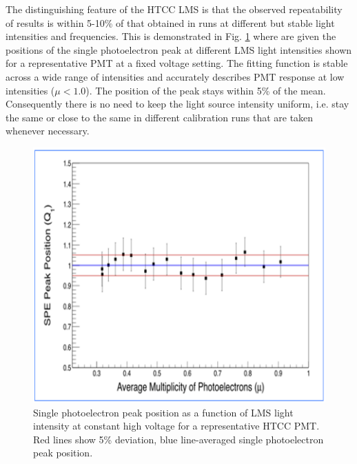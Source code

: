 The distinguishing feature of the HTCC LMS is that the observed repeatability of results is within 5-10\% of that obtained in runs at different but stable light intensities and frequencies. This is demonstrated in Fig. \ref{fig:WILLIAM_5} where are given the positions of the single photoelectron peak at different LMS light intensities shown for a representative PMT at a fixed voltage setting. The fitting function is stable across a wide range of intensities and accurately describes PMT response at low intensities ($\mu<1.0$). The position of the peak stays within 5\% of the mean. Consequently there is no need to keep the light source intensity uniform, i.e. stay the same or close to the same in different calibration runs that are taken whenever necessary.

\begin{figure}[ht]
\centering
\includegraphics[width=0.99\linewidth]{images/WILLIAM_5.png}
\caption{Single photoelectron peak position as a function of LMS light intensity at constant high voltage for a representative HTCC PMT. Red lines show 5\% deviation, blue line-averaged single photoelectron peak position.}
\label{fig:WILLIAM_5}
\end{figure}

